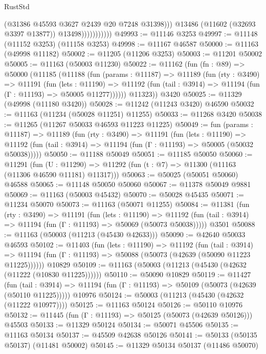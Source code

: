 \begin{lexlean}{RustStd}
\begin{coremodule}
                              (@31386 @45593 @3627 @2439 @20 @7248 @31398)))
                          @13486
                          (@11602 (@32693 @3397 @13877))
                          @13498)))))))))))
@49993 := @11146 @3253
@49997 := @11148 (@11152 @3253) (@11158 @3253)
@49998 := @11167 @46587
@50000 := @11163 (@49998 @11182)
@50002 := @11205 (@11206 @3253)
@50003 := @11201 @50002
@50005 := @11163 (@50003 @11230)
@50022 := @11162
    (fun (fn : @89) =>
    @50000
      (@11185
        (@11188
          (fun (params : @11187) =>
          @11189
            (fun (rty : @3490) =>
            @11191
              (fun (lets : @11190) =>
              @11192 (fun (tail : @3914) => @11194 (fun (Γ : @11193) => @50005 @11277))))))
        @11323))
    @3420
@50025 := @11329 (@49998 (@11180 @3420))
@50028 := @11242 (@11243 @3420) @46590
@50032 := @11163 (@11234 (@50028 @11251) @11255)
@50033 := @11268 @3420
@50038 := @11265 (@11267 @50033 @46593 @11223 @11225)
@50049 := fun (params : @11187) =>
  @11189
    (fun (rty : @3490) =>
    @11191
      (fun (lets : @11190) =>
      @11192 (fun (tail : @3914) => @11194 (fun (Γ : @11193) => @50005 (@50032 @50038)))))
@50050 := @11188 @50049
@50051 := @11185 @50050
@50060 := @11291
    (fun (U : @11290) => @11292 (fun (t : @7) => @11300 (@11163 (@11306 @46590 @11181) @11317)))
@50063 := @50025 (@50051 @50060) @46588
@50065 := @11148 @50050 @50060
@50067 := @11378 @50049 @9881
@50069 := @11163 (@50003 @45432)
@50070 := @50028 @45435
@50071 := @11234 @50070
@50073 := @11163 (@50071 @11255)
@50084 := @11381
    (fun (rty : @3490) =>
    @11191
      (fun (lets : @11190) =>
      @11192 (fun (tail : @3914) => @11194 (fun (Γ : @11193) => @50069 (@50073 @50038)))))
    @3501
@50088 := @11163 (@50003 (@11213 (@45430 @42633)))
@50090 := @42640 @50033 @46593
@50102 := @11403
    (fun (lets : @11190) =>
    @11192
      (fun (tail : @3914) =>
      @11194 (fun (Γ : @11193) => @50088 (@50073 (@42639 (@50090 @11223 @11225))))))
    @10829
@50109 := @11163 (@50003 (@11213 (@45430 (@42632 (@11222 (@10830 @11225))))))
@50110 := @50090 @10829
@50119 := @11427
    (fun (tail : @3914) => @11194 (fun (Γ : @11193) => @50109 (@50073 (@42639 (@50110 @11225)))))
    @10976
@50124 := @50003 (@11213 (@45430 (@42632 (@11222 @10977))))
@50125 := @11163 @50124
@50126 := @50110 @10976
@50132 := @11445 (fun (Γ : @11193) => @50125 (@50073 (@42639 @50126))) @45503
@50133 := @11329 @50124
@50134 := @50071 @45506
@50135 := @11163 @50134
@50137 := @45509 @42638 @50126
@50141 := @50133 (@50135 @50137) (@11481 @50002)
@50145 := @11329 @50134 @50137 (@11486 @50070)

\end{coremodule}
\end{lexlean}

